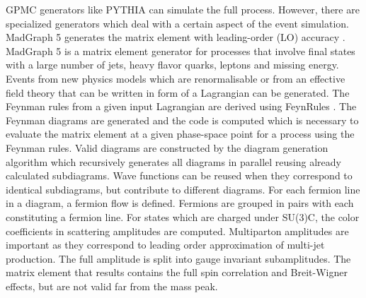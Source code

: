 GPMC generators like PYTHIA can simulate the full process. However, there are specialized generators which deal with a certain aspect of the event simulation. MadGraph 5 generates the matrix element with leading-order (LO) accuracy \cite{Alwall:2011uj}. MadGraph 5 is a matrix element generator for processes that involve final states with a large number of jets, heavy flavor quarks, leptons and missing energy. Events from new physics models which are renormalisable or from an effective field theory that can be written in form of a Lagrangian can be generated. The Feynman rules from a given input Lagrangian are derived using FeynRules \cite{Christensen:2008py}. The Feynman diagrams are generated and the code is computed which is necessary to evaluate the matrix element at a given phase-space point for a process using the Feynman rules. Valid diagrams are constructed by the diagram generation algorithm which recursively generates all diagrams in parallel reusing already calculated subdiagrams. Wave functions can be reused when they correspond to identical subdiagrams, but contribute to different diagrams. For each fermion line in a diagram, a fermion flow is defined. Fermions are grouped in pairs with each constituting a fermion line. For states which are charged under SU(3)C, the color coefficients in scattering amplitudes are computed. Multiparton amplitudes are important as they correspond to leading order approximation of multi-jet production. The full amplitude is split into gauge invariant subamplitudes. The matrix element that results contains the full spin correlation and Breit-Wigner effects, but are not valid far from the mass peak.

